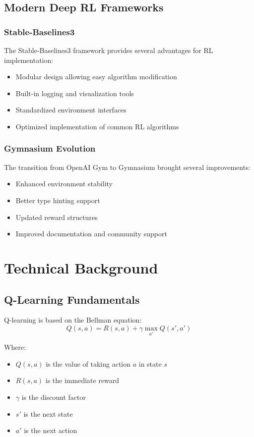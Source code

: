 \documentclass[conference]{IEEEtran}
\begin{document}
\subsection{Modern Deep RL Frameworks}
\subsubsection{Stable-Baselines3}
The Stable-Baselines3 framework provides several advantages for RL implementation:
\begin{itemize}
    \item Modular design allowing easy algorithm modification
    \item Built-in logging and visualization tools
    \item Standardized environment interfaces
    \item Optimized implementation of common RL algorithms
\end{itemize}

\subsubsection{Gymnasium Evolution}
The transition from OpenAI Gym to Gymnasium brought several improvements:
\begin{itemize}
    \item Enhanced environment stability
    \item Better type hinting support
    \item Updated reward structures
    \item Improved documentation and community support
\end{itemize}

\section{Technical Background}
\subsection{Q-Learning Fundamentals}
Q-learning is based on the Bellman equation:
\begin{equation}
    Q(s,a) = R(s,a) + \gamma \max_{a'} Q(s',a')
\end{equation}

Where:
\begin{itemize}
    \item $Q(s,a)$ is the value of taking action $a$ in state $s$
    \item $R(s,a)$ is the immediate reward
    \item $\gamma$ is the discount factor
    \item $s'$ is the next state
    \item $a'$ is the next action
\end{itemize}
\end{document}
